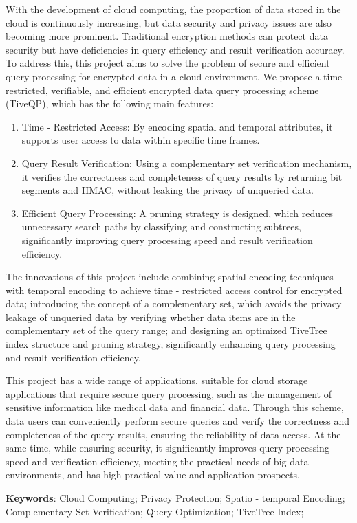\documentclass{cumcmthesis}
\numberwithin{equation}{section} %
\numberwithin{figure}{section} %
\numberwithin{table}{section} %
\begin{document}
\begin{enabstract}
With the development of cloud computing, the proportion of data stored in the cloud is continuously increasing, but data security and privacy issues are also becoming more prominent. Traditional encryption methods can protect data security but have deficiencies in query efficiency and result verification accuracy. To address this, this project aims to solve the problem of secure and efficient query processing for encrypted data in a cloud environment. We propose a time - restricted, verifiable, and efficient encrypted data query processing scheme (TiveQP), which has the following main features:
\begin{enumerate}
    \item Time - Restricted Access: By encoding spatial and temporal attributes, it supports user access to data within specific time frames.
    \item Query Result Verification: Using a complementary set verification mechanism, it verifies the correctness and completeness of query results by returning bit segments and HMAC, without leaking the privacy of unqueried data.
    \item Efficient Query Processing: A pruning strategy is designed, which reduces unnecessary search paths by classifying and constructing subtrees, significantly improving query processing speed and result verification efficiency.
\end{enumerate}
The innovations of this project include combining spatial encoding techniques with temporal encoding to achieve time - restricted access control for encrypted data; introducing the concept of a complementary set, which avoids the privacy leakage of unqueried data by verifying whether data items are in the complementary set of the query range; and designing an optimized TiveTree index structure and pruning strategy, significantly enhancing query processing and result verification efficiency.
    
This project has a wide range of applications, suitable for cloud storage applications that require secure query processing, such as the management of sensitive information like medical data and financial data. Through this scheme, data users can conveniently perform secure queries and verify the correctness and completeness of the query results, ensuring the reliability of data access. At the same time, while ensuring security, it significantly improves query processing speed and verification efficiency, meeting the practical needs of big data environments, and has high practical value and application prospects.
    
\textbf{Keywords}: Cloud Computing; Privacy Protection; Spatio - temporal Encoding; Complementary Set Verification; Query Optimization; TiveTree Index;
\end{enabstract}
\end{document}
